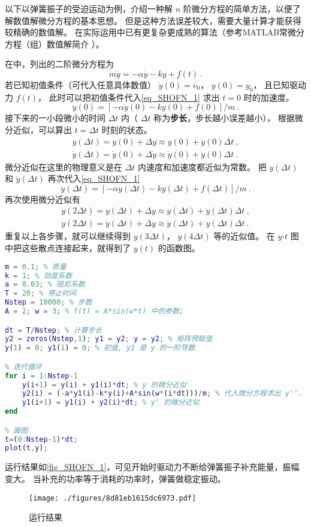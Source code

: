 

以下以弹簧振子的受迫运动为例，介绍一种解 $n$ 阶微分方程的简单方法，以便了解数值解微分方程的基本思想。 但是这种方法误差较大，需要大量计算才能获得较精确的数值解。 在实际运用中已有更复杂更成熟的算法（参考MATLAB常微分方程（组）数值解简介%
）。

在中，列出的二阶微分方程为
\begin{equation}\label{eq_SHOFN_1}
m\ddot y = -\alpha \dot y - ky + f(t)~.
\end{equation}
若已知初值条件（可代入任意具体数值） $\dot y(0) = v_0$，  $y(0) = y_0$， 且已知驱动力 $f(t)$， 此时可以把初值条件代入\autoref{eq_SHOFN_1} 求出 $t = 0$ 时的加速度。
\begin{equation}
\ddot y(0) = [- \alpha \dot y(0) - ky(0) + f(0)]/m~.
\end{equation}
接下来的一小段微小的时间 $\Delta t$ 内（ $\Delta t$ 称为\textbf{步长}，步长越小误差越小）， 根据微分近似，可以算出 $t = \Delta t$ 时刻的状态。
\begin{gather}
y(\Delta t) =  y(0) + \Delta y \approx y(0) + \dot y(0) \Delta t~,\\
\dot y(\Delta t) = \dot y(0) + \Delta \dot y \approx \dot y(0) + \ddot y(0) \Delta t~.
\end{gather}
微分近似在这里的物理意义是在 $\Delta t$ 内速度和加速度都近似为常数。 把 $y(\Delta t)$ 和 $\dot y(\Delta t)$ 再次代入\autoref{eq_SHOFN_1}
\begin{equation}
\ddot y(\Delta t) = [- \alpha \dot y(\Delta t) - ky(\Delta t) + f(\Delta t)]/m~.
\end{equation}
再次使用微分近似有
\begin{gather}
y(2\Delta t) =  y(\Delta t) + \Delta y \approx y(\Delta t) + \dot y(\Delta t) \Delta t~,\\
\dot y(2\Delta t) = \dot y(\Delta t) + \Delta \dot y \approx \dot y(\Delta t) + \ddot y(\Delta t) \Delta t~.
\end{gather}
重复以上各步骤，就可以继续得到 $y(3\Delta t)$，  $y(4\Delta t)$ 等的近似值。 在 $y$-$t$ 图中把这些散点连接起来，就得到了 $y(t)$ 的函数图。

\begin{lstlisting}[language=matlab, caption=SHOf.m]
% 参数设定
m = 0.1; % 质量
k = 1; % 劲度系数
a = 0.03; % 阻尼系数
T = 20; % 停止时间
Nstep = 10000; % 步数
A = 2; w = 3; % f(t) = A*sin(w*t) 中的参数;

dt = T/Nstep; % 计算步长
y2 = zeros(Nstep,1); y1 = y2; y = y2; % 矩阵预赋值
y(1) = 0; y1(1) = 0; % 初值, y1 是 y 的一阶导数

% 迭代循环
for i = 1:Nstep-1
    y(i+1) = y(i) + y1(i)*dt; % y 的微分近似
    y2(i) = (-a*y1(i)-k*y(i)+A*sin(w*(i*dt)))/m; % 代入微分方程求出 y''.
    y1(i+1) = y1(i) + y2(i)*dt; % y' 的微分近似
end

% 画图
t=(0:Nstep-1)*dt;
plot(t,y);
\end{lstlisting}

运行结果如\autoref{fig_SHOFN_1}，可见开始时驱动力不断给弹簧振子补充能量，振幅变大。 当补充的功率等于消耗的功率时，弹簧做稳定振动。
\begin{figure}[ht]
\centering
\texttt{[image: ./figures/8d81eb1615dc6973.pdf]}
\caption{运行结果}\label{fig_SHOFN_1}
\end{figure}
